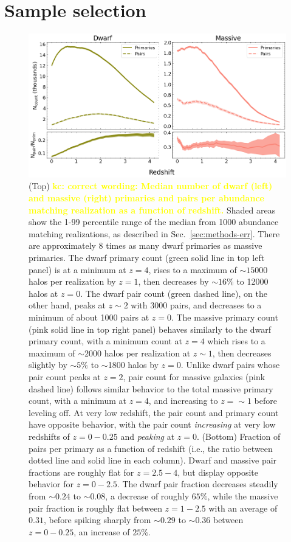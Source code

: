 \documentclass[twocolumn]{aastex631}
\newcommand{\kc}[1]{\textcolor{yellow}{\textbf{kc: #1}} }
\begin{document}
\section{Sample selection}\label{sec:methods}
  \begin{figure}[htp]
    \centering
    \includegraphics[width=\textwidth]{counts_1000.png}
    \caption{(Top) \kc{correct wording: Median number of dwarf (left) and massive (right) primaries and pairs per abundance matching realization as a function of redshift.} 
    Shaded areas show the 1-99 percentile range of the median from 1000 abundance matching realizations, as described in Sec.~\ref{sec:methods-err}.
    There are approximately 8 times as many dwarf primaries as massive primaries. 
    The dwarf primary count (green solid line in top left panel) is at a minimum at $z=4$, rises to a maximum of $\sim15000$ halos per realization by $z=1$, then decreases by $\sim16\%$ to 12000 halos at $z=0$. The dwarf pair count (green dashed line), on the other hand, peaks at $z\sim2$ with 3000 pairs, and decreases to a minimum of about 1000 pairs at $z=0$.
    The massive primary count (pink solid line in top right panel) behaves similarly to the dwarf primary count, with a minimum count at $z=4$ which rises to a maximum of $\sim2000$ halos per realization at $z\sim1$, then decreases slightly by $\sim5\%$ to $\sim$1800 halos by $z=0$. 
    Unlike dwarf pairs whose pair count peaks at $z=2$, pair count for massive galaxies (pink dashed line) follows similar behavior to the total massive primary count, with a minimum at $z=4$, and increasing to $z=\sim 1$ before leveling off. At very low redshift, the pair count and primary count have opposite behavior, with the pair count \textit{increasing} at very low redshifts of $z=0-0.25$ and \textit{peaking} at $z=0$.
    (Bottom) Fraction of pairs per primary as a function of redshift (i.e., the ratio between dotted line and solid line in each column). Dwarf and massive pair fractions are roughly flat for $z=2.5-4$, but display opposite behavior for $z=0-2.5$. The dwarf pair fraction decreases steadily from $\sim0.24$ to $\sim0.08$, a decrease of roughly $65\%$, while the massive pair fraction is roughly flat between $z=1-2.5$ with an average of $0.31$, before spiking sharply from $\sim 0.29$ to $\sim 0.36$ between $z=0-0.25$, an increase of $25\%$.}
    \label{fig:counts}
  \end{figure}
\end{document}
